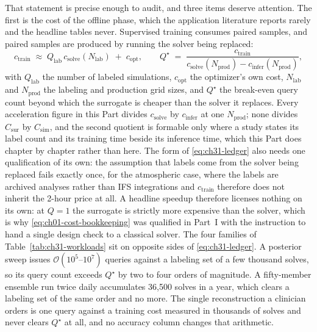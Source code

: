 That statement is precise enough to audit, and three items deserve attention. The first is the
cost of the offline phase, which the application literature reports rarely and the headline tables
never. Supervised
training consumes paired samples, and paired samples are produced by running the solver being
replaced:
\begin{equation}
  \label{eq:ch31-ledger}
  c_{\mathrm{train}} \;\approx\; Q_{\mathrm{lab}}\, c_{\mathrm{solve}}(N_{\mathrm{lab}}) \;+\; c_{\mathrm{opt}},
  \qquad
  Q^{\star} \;=\; \frac{c_{\mathrm{train}}}{c_{\mathrm{solve}}(N_{\mathrm{prod}}) - c_{\mathrm{infer}}(N_{\mathrm{prod}})},
\end{equation}
with $Q_{\mathrm{lab}}$ the number of labeled simulations, $c_{\mathrm{opt}}$ the optimizer's own
cost, $N_{\mathrm{lab}}$ and $N_{\mathrm{prod}}$ the labeling and production grid sizes, and
$Q^{\star}$ the break-even query count beyond which the surrogate is cheaper than the solver it
replaces. Every acceleration figure in this Part divides $c_{\mathrm{solve}}$ by
$c_{\mathrm{infer}}$ at one $N_{\mathrm{prod}}$; none divides $C_{\mathrm{sur}}$ by
$C_{\mathrm{sim}}$, and the second quotient is formable only where a study states its label count
and its training time beside its inference time, which this Part does chapter by chapter rather
than here. The form of \eqref{eq:ch31-ledger} also needs one qualification of its own: the
assumption that labels come from the solver being replaced fails exactly once, for the atmospheric
case, where the labels are archived analyses rather than IFS integrations and $c_{\mathrm{train}}$
therefore does not inherit the 2-hour price at all. A headline
speedup therefore licenses nothing on its own: at $Q = 1$ the surrogate is strictly more expensive
than the solver, which is why \eqref{eq:ch01-cost-bookkeeping} was qualified in Part~I with the
instruction to hand a single design check to a classical
solver. The four families of Table~\ref{tab:ch31-workloads} sit on
opposite sides of \eqref{eq:ch31-ledger}. A posterior sweep issues
$\mathcal{O}(10^{5}\text{--}10^{7})$ queries against a labeling set of a few thousand solves, so
its query count exceeds $Q^{\star}$ by two to four orders of magnitude. A fifty-member ensemble
run twice daily accumulates 36{,}500 solves in a year, which clears a labeling set of the same
order and no more. The single reconstruction a clinician orders is one query against a training
cost measured in thousands of solves and never clears $Q^{\star}$ at all, and no accuracy column
changes that arithmetic.

